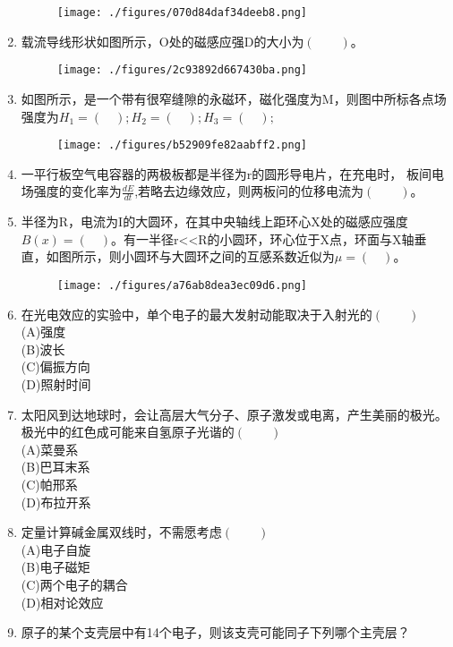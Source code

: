 \begin{enumerate}
\begin{figure}[ht]
\centering
\texttt{[image: ./figures/070d84daf34deeb8.png]}
\caption{} \label{fig_HSD15_10}
\end{figure}
\item 载流导线形状如图所示，O处的磁感应强D的大小为$(\qquad)$。
\begin{figure}[ht]
\centering
\texttt{[image: ./figures/2c93892d667430ba.png]}
\caption{} \label{fig_HSD15_11}
\end{figure}
\item 如图所示，是一个带有很窄缝隙的永磁环，磁化强度为M，则图中所标各点场强度为$H_1=(\quad);H_2=(\quad);H_3=(\quad);$
\begin{figure}[ht]
\centering
\texttt{[image: ./figures/b52909fe82aabff2.png]}
\caption{} \label{fig_HSD15_12}
\end{figure}
\item 一平行板空气电容器的两极板都是半径为r的圆形导电片，在充电时，
板间电场强度的变化率为$\displaystyle \frac{dE}{dt}$,若略去边缘效应，则两板问的位移电流为$(\qquad)$。
\item 半径为R，电流为I的大圆环，在其中央轴线上距环心X处的磁感应强度 $B(x)=(\quad)$。有一半径r<<R的小圆环，环心位于X点，环面与X轴垂直，如图所示，则小圆环与大圆环之间的互感系数近似为$\mu=(\quad)$。
\begin{figure}[ht]
\centering
\texttt{[image: ./figures/a76ab8dea3ec09d6.png]}
\caption{} \label{fig_HSD15_13}
\end{figure}
\item 在光电效应的实验中，单个电子的最大发射动能取决于入射光的$(\qquad)$\\
(A)强度\\
(B)波长\\
(C)偏振方向\\
(D)照射时间
\item 太阳风到达地球时，会让高层大气分子、原子激发或电离，产生美丽的极光。极光中的红色成可能来自氢原子光谐的$(\qquad)$\\
(A)菜曼系\\
(B)巴耳末系\\
(C)帕邢系\\
(D)布拉开系
\item 定量计算碱金属双线时，不需愿考虑$(\qquad)$\\
(A)电子自旋\\
(B)电子磁矩\\
(C)两个电子的耦合\\
(D)相对论效应
\item 原子的某个支壳层中有14个电子，则该支壳可能同子下列哪个主壳层？\\

\end{enumerate}
